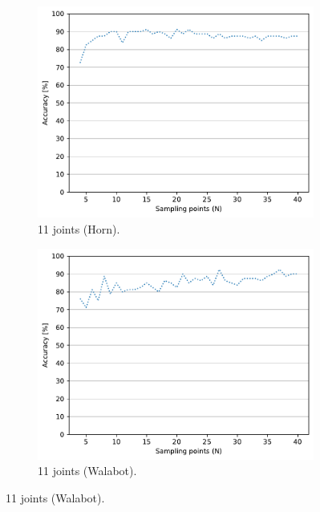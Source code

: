 \begin{figure}[htbp]
    \begin{subfigure}{.49\textwidth}
        \centering
        \includegraphics[width=.99\linewidth]{Figures/RadarExperiments/Datasets/SensorsComparison/LMC/LMC+Horn-samples-11.pdf}  
        \vspace{-15pt}
        \captionsetup{width=.99\linewidth}
        \caption{11 joints (Horn).}
        \label{fig:radar-experiments:sensors:lmc-samples:horn-11}
    \end{subfigure}
    \begin{subfigure}{.49\textwidth}
        \centering
        \includegraphics[width=.99\linewidth]{Figures/RadarExperiments/Datasets/SensorsComparison/LMC/LMC+Walabot-samples-11.pdf}  
        \vspace{-15pt}
        \captionsetup{width=.99\linewidth}
        \caption{11 joints (Walabot).}
        \label{fig:radar-experiments:sensors:lmc-samples:walabot-11}
    \end{subfigure}


\end{figure}
